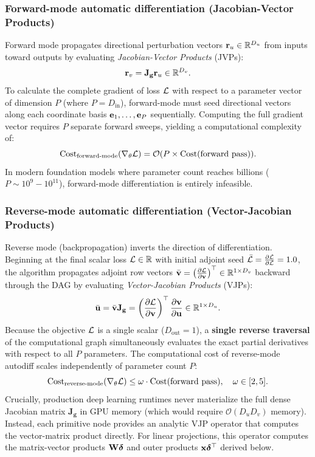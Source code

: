 \documentclass[../../main.tex]{subfiles}
\begin{document}
\subsubsection{Forward-mode automatic differentiation (Jacobian-Vector Products)}
Forward mode propagates directional perturbation vectors $\mathbf{r}_u \in \mathbb{R}^{D_u}$ from inputs toward outputs by evaluating \emph{Jacobian-Vector Products} (JVPs):
\begin{equation}
\mathbf{r}_v = \mathbf{J}_{\mathbf{g}} \mathbf{r}_u \in \mathbb{R}^{D_v}.
\end{equation}
To calculate the complete gradient of loss $\mathcal{L}$ with respect to a parameter vector of dimension $P$ (where $P = D_{\text{in}}$), forward-mode must seed directional vectors along each coordinate basis $\mathbf{e}_1, \dots, \mathbf{e}_P$ sequentially. Computing the full gradient vector requires $P$ separate forward sweeps, yielding a computational complexity of:
\begin{equation}
\text{Cost}_{\text{forward-mode}}(\nabla_\theta \mathcal{L}) = \mathcal{O}(P \times \text{Cost}(\text{forward pass})).
\end{equation}
In modern foundation models where parameter count reaches billions ($P \sim 10^9 - 10^{11}$), forward-mode differentiation is entirely infeasible.

\subsubsection{Reverse-mode automatic differentiation (Vector-Jacobian Products)}
Reverse mode (backpropagation) inverts the direction of differentiation. Beginning at the final scalar loss $\mathcal{L} \in \mathbb{R}$ with initial adjoint seed $\bar{\mathcal{L}} = \frac{\partial \mathcal{L}}{\partial \mathcal{L}} = 1.0$, the algorithm propagates adjoint row vectors $\bar{\mathbf{v}} = \left(\frac{\partial \mathcal{L}}{\partial \mathbf{v}}\right)^\top \in \mathbb{R}^{1 \times D_v}$ backward through the DAG by evaluating \emph{Vector-Jacobian Products} (VJPs):
\begin{equation}
\label{eq:vjp_equation}
\bar{\mathbf{u}} = \bar{\mathbf{v}} \mathbf{J}_{\mathbf{g}} = \left(\frac{\partial \mathcal{L}}{\partial \mathbf{v}}\right)^\top \frac{\partial \mathbf{v}}{\partial \mathbf{u}} \in \mathbb{R}^{1 \times D_u}.
\end{equation}
Because the objective $\mathcal{L}$ is a single scalar ($D_{\text{out}} = 1$), a \textbf{single reverse traversal} of the computational graph simultaneously evaluates the exact partial derivatives with respect to all $P$ parameters. The computational cost of reverse-mode autodiff scales independently of parameter count $P$:
\begin{equation}
\text{Cost}_{\text{reverse-mode}}(\nabla_\theta \mathcal{L}) \le \omega \cdot \text{Cost}(\text{forward pass}), \quad \omega \in [2, 5].
\end{equation}
Crucially, production deep learning runtimes never materialize the full dense Jacobian matrix $\mathbf{J}_{\mathbf{g}}$ in GPU memory (which would require $\mathcal{O}(D_u D_v)$ memory). Instead, each primitive node provides an analytic VJP operator that computes the vector-matrix product directly. For linear projections, this operator computes the matrix-vector products $\mathbf{W} \bm{\delta}$ and outer products $\mathbf{x} \bm{\delta}^\top$ derived below.
\end{document}
